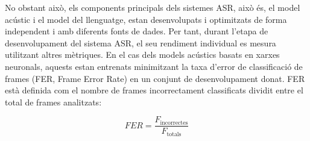 No obstant això, els components principals dels sistemes ASR, això és, el model acústic i el model del llenguatge, estan desenvolupats i optimitzats de forma independent i amb diferents fonts de dades. Per tant, durant l'etapa de desenvolupament del sistema ASR, el seu rendiment individual es mesura utilitzant altres mètriques. 
En el cas dels models acústics basats en xarxes neuronals, aquests estan entrenats minimitzant la taxa d'error de classificació de frames (FER, Frame Error Rate) en un conjunt de desenvolupament donat.
FER està definida com el nombre de frames incorrectament classificats dividit entre el total de frames analitzats:

\begin{equation}
FER = \frac{F_{\text{incorrectes}}}{F_{\text{totals}}}
\end{equation}

